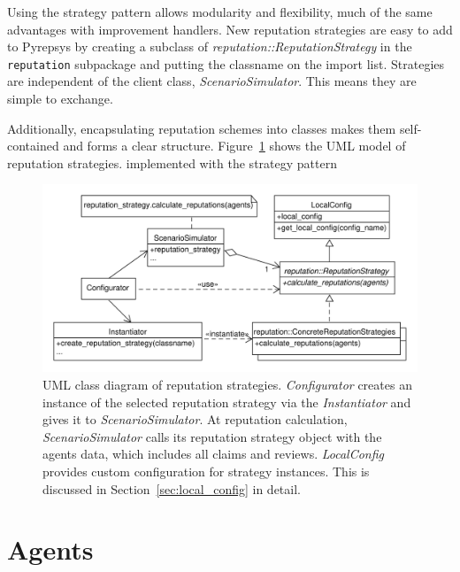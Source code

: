 \documentclass[%
    ]{\PathToTumTemplate/thesis/tum_thesis}
\begin{document}
Using the strategy pattern allows modularity and flexibility, much of the same advantages with improvement handlers.
New reputation strategies are easy to add to Pyrepsys by creating a subclass of \emph{reputation::ReputationStrategy} in the \texttt{reputation} subpackage and putting the classname on the import list.
Strategies are independent of the client class, \emph{ScenarioSimulator}.
This means they are simple to exchange.

Additionally, encapsulating reputation schemes into classes makes them self-contained and forms a clear structure.
Figure~\ref{fig:reputation_strategy} shows the UML model of reputation strategies.
implemented with the strategy pattern

\begin{figure}[tbp]
  \begin{center}
        \includegraphics[width=1\linewidth]	{../uml/reputation_strategy.pdf}
    \caption{
	UML class diagram of reputation strategies.
	\emph{Configurator} creates an instance of the selected reputation strategy via the \emph{Instantiator} and gives it to \emph{ScenarioSimulator}.
	At reputation calculation, \emph{ScenarioSimulator} calls its reputation strategy object with the agents data, which includes all claims and reviews.
	\emph{LocalConfig} provides custom configuration for strategy instances.
	This is discussed in Section~\ref{sec:local_config} in detail.
    }
    \label{fig:reputation_strategy}
  \end{center}
\end{figure}



\section{Agents}\label{sec:impl_agent}
\end{document}
